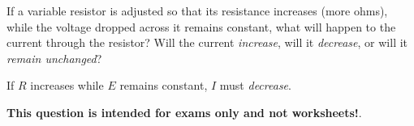 

If a variable resistor is adjusted so that its resistance increases (more ohms), while the voltage dropped across it remains constant, what will happen to the current through the resistor?  Will the current {\it increase}, will it {\it decrease}, or will it {\it remain unchanged}?







If $R$ increases while $E$ remains constant, $I$ must {\it decrease}.







{\bf This question is intended for exams only and not worksheets!}.



